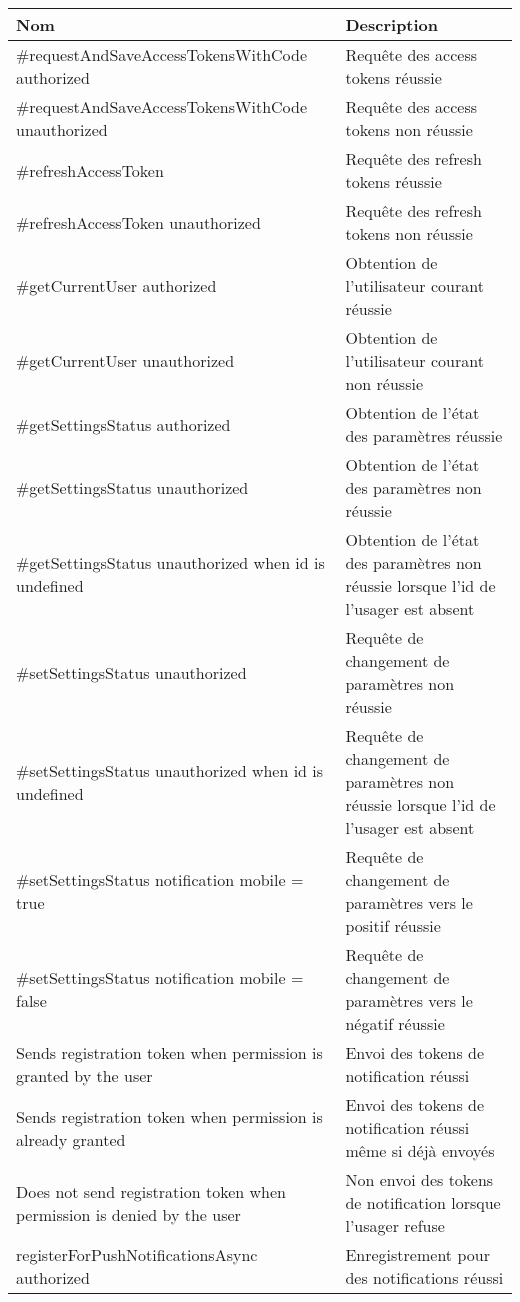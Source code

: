 \begin{tabular}{P{0.45\textwidth}P{0.45\textwidth}}
\hline
\bf Nom
&
\bf Description
\\
\hline
\hline
\#requestAndSaveAccessTokensWithCode authorized
&
Requête des access tokens réussie
\\
\#requestAndSaveAccessTokensWithCode unauthorized
&
Requête des access tokens non réussie
\\
\#refreshAccessToken
&
Requête des refresh tokens réussie
\\
\#refreshAccessToken unauthorized
&
Requête des refresh tokens non réussie
\\
\#getCurrentUser authorized
&
Obtention de l'utilisateur courant réussie
\\
\#getCurrentUser unauthorized
&
Obtention de l'utilisateur courant non réussie
\\
\#getSettingsStatus authorized
&
Obtention de l'état des paramètres réussie
\\
\#getSettingsStatus unauthorized
&
Obtention de l'état des paramètres non réussie
\\
\#getSettingsStatus unauthorized when id is undefined
&
Obtention de l'état des paramètres non réussie lorsque l'id de l'usager est absent
\\
\#setSettingsStatus unauthorized
&
Requête de changement de paramètres non réussie
\\
\#setSettingsStatus unauthorized when id is undefined
&
Requête de changement de paramètres non réussie lorsque l'id de l'usager est absent
\\
\#setSettingsStatus notification mobile = true
&
Requête de changement de paramètres vers le positif réussie
\\
\#setSettingsStatus notification mobile = false
&
Requête de changement de paramètres vers le négatif réussie
\\
Sends registration token when permission is granted by the user
&
Envoi des tokens de notification réussi
\\
Sends registration token when permission is already granted
&
Envoi des tokens de notification réussi même si déjà envoyés
\\
Does not send registration token when permission is denied by the user
&
Non envoi des tokens de notification lorsque l'usager refuse
\\
registerForPushNotificationsAsync authorized
&
Enregistrement pour des notifications réussi     
\\
\hline
\end{tabular}
